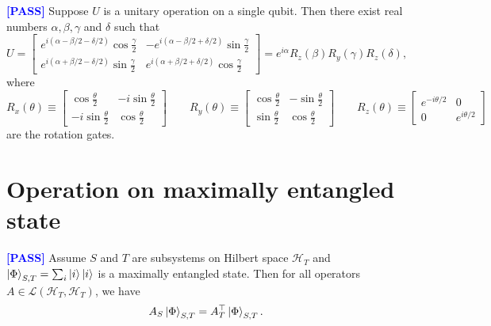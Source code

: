 \documentclass[manuscript, review, timestamp]{acmart}
\newcommand{\pass}{\textcolor{blue}{\textbf{ [PASS] }}}
\begin{document}
\begin{example} \pass
  Suppose $U$ is a unitary operation on a single qubit. Then there exist real numbers $\alpha, \beta, \gamma$ and $\delta$ such that $$
  U = \left[
  \begin{array}{cc}
  e^{i(\alpha - \beta/2 - \delta/2)} \cos \frac{\gamma}{2} & -e^{i(\alpha - \beta/2 + \delta/2)} \sin \frac{\gamma}{2} \\
  e^{i(\alpha + \beta/2 - \delta/2)} \sin \frac{\gamma}{2} & e^{i(\alpha + \beta/2 + \delta/2)} \cos \frac{\gamma}{2}
  \end{array}
  \right]
  = e^{i\alpha}R_z(\beta)R_y(\gamma)R_z(\delta),
  $$
  where
\[
  R_x(\theta) \equiv
  \begin{bmatrix}
  \cos \frac{\theta}{2} & -i \sin \frac{\theta}{2} \\
  -i \sin \frac{\theta}{2} & \cos \frac{\theta}{2}
  \end{bmatrix}
  \qquad
  R_y(\theta) \equiv
  \begin{bmatrix}
  \cos \frac{\theta}{2} & -\sin \frac{\theta}{2} \\
  \sin \frac{\theta}{2} & \cos \frac{\theta}{2}
  \end{bmatrix}
  \qquad
  R_z(\theta) \equiv
  \begin{bmatrix}
  e^{-i \theta / 2} & 0 \\
  0 & e^{i \theta / 2}
  \end{bmatrix}
  \]
  are the rotation gates.
\end{example}


\section{Operation on maximally entangled state}
\begin{example} \pass
  Assume $S$ and $T$ are subsystems on Hilbert space $\mathcal{H}_T$ and $\ket{\Phi}_{S,T} = \sum_i \ket{i}\ket{i}$ is a maximally entangled state. Then for all operators $A\in\mathcal{L}(\mathcal{H}_T, \mathcal{H}_T)$, we have 
  $$
  A_S\ket{\Phi}_{S, T} = A_T^\top\ket{\Phi}_{S, T}.
  $$
\end{example}
\end{document}
